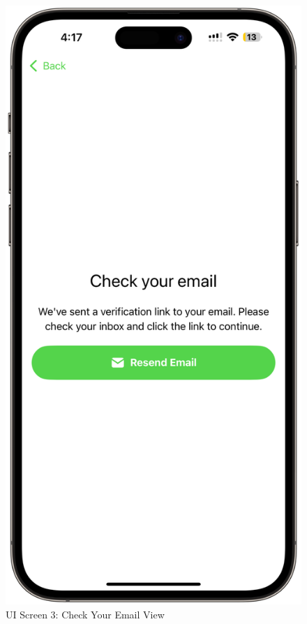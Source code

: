 \begin{figure}[!h]
    \begin{minipage}{0.3\textwidth}
        \centering
        \includegraphics[width=\textwidth]{images/screen3.png}
        \caption{UI Screen 3: Check Your Email View}

\end{minipage}
\end{figure}
